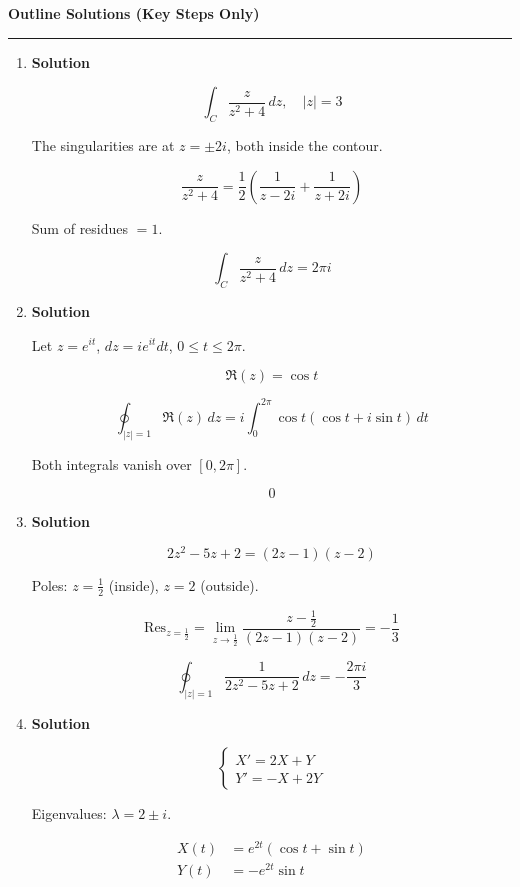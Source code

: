 \documentclass[12pt,a4paper]{article}
\begin{document}
\begin{center}
\Large \textbf{Outline Solutions (Key Steps Only)}
\end{center}

\hrule
\vspace{0.6em}

\begin{enumerate}

\item \textbf{Solution}

\[
\int_C \frac{z}{z^2+4}\,dz,\quad |z|=3
\]

The singularities are at $z=\pm 2i$, both inside the contour.

\[
\frac{z}{z^2+4}
=\frac12\left(\frac{1}{z-2i}+\frac{1}{z+2i}\right)
\]

Sum of residues $=1$.

\[
\boxed{\int_C \frac{z}{z^2+4}\,dz = 2\pi i}
\]

\item \textbf{Solution}

Let $z=e^{it}$, $dz=i e^{it}dt$, $0\le t\le2\pi$.

\[
\Re(z)=\cos t
\]

\[
\oint_{|z|=1}\Re(z)\,dz
= i\int_0^{2\pi}\cos t(\cos t+i\sin t)\,dt
\]

Both integrals vanish over $[0,2\pi]$.

\[
\boxed{0}
\]

\item \textbf{Solution}

\[
2z^2-5z+2=(2z-1)(z-2)
\]

Poles: $z=\frac12$ (inside), $z=2$ (outside).

\[
\text{Res}_{z=\frac12}
=\lim_{z\to\frac12}\frac{z-\frac12}{(2z-1)(z-2)}
=-\frac13
\]

\[
\boxed{\oint_{|z|=1}\frac{1}{2z^2-5z+2}\,dz
=-\frac{2\pi i}{3}}
\]

\item \textbf{Solution}

\[
\begin{cases}
X' = 2X + Y\\
Y' = -X + 2Y
\end{cases}
\]

Eigenvalues: $\lambda=2\pm i$.

\[
\boxed{
\begin{aligned}
X(t)&=e^{2t}(\cos t+\sin t)\\
Y(t)&=-e^{2t}\sin t
\end{aligned}}
\]


\end{enumerate}
\end{document}
